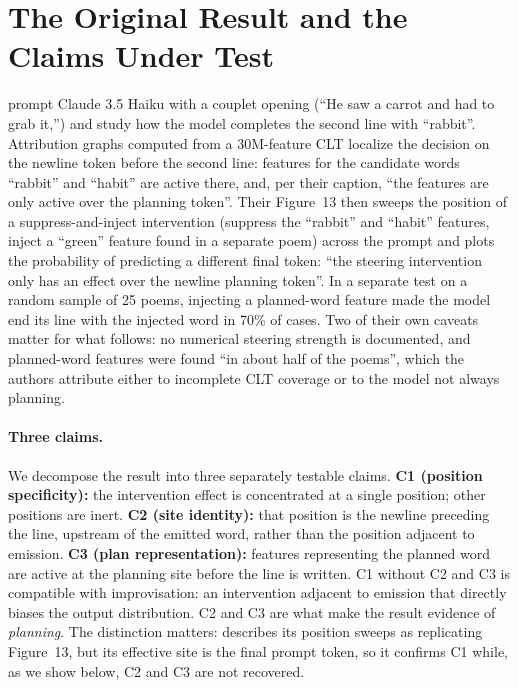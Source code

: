 \documentclass[11pt]{article}
\begin{document}
\section{The Original Result and the Claims Under Test}
\label{sec:original}

\citet{lindsey2025biology} prompt Claude 3.5 Haiku with a couplet opening (``He saw a carrot and had to grab it,'') and study how the model completes the second line with ``rabbit''. Attribution graphs computed from a 30M-feature CLT localize the decision on the newline token before the second line: features for the candidate words ``rabbit'' and ``habit'' are active there, and, per their caption, ``the features are only active over the planning token''. Their Figure~13 then sweeps the position of a suppress-and-inject intervention (suppress the ``rabbit'' and ``habit'' features, inject a ``green'' feature found in a separate poem) across the prompt and plots the probability of predicting a different final token: ``the steering intervention only has an effect over the newline planning token''. In a separate test on a random sample of 25 poems, injecting a planned-word feature made the model end its line with the injected word in 70\% of cases. Two of their own caveats matter for what follows: no numerical steering strength is documented, and planned-word features were found ``in about half of the poems'', which the authors attribute either to incomplete CLT coverage or to the model not always planning.

\paragraph{Three claims.}
We decompose the result into three separately testable claims. \textbf{C1 (position specificity):} the intervention effect is concentrated at a single position; other positions are inert. \textbf{C2 (site identity):} that position is the newline preceding the line, upstream of the emitted word, rather than the position adjacent to emission. \textbf{C3 (plan representation):} features representing the planned word are active at the planning site before the line is written. C1 without C2 and C3 is compatible with improvisation: an intervention adjacent to emission that directly biases the output distribution. C2 and C3 are what make the result evidence of \emph{planning}. The distinction matters: \citet{jacopin2026prolepsis} describes its position sweeps as replicating Figure~13, but its effective site is the final prompt token, so it confirms C1 while, as we show below, C2 and C3 are not recovered.
\end{document}
